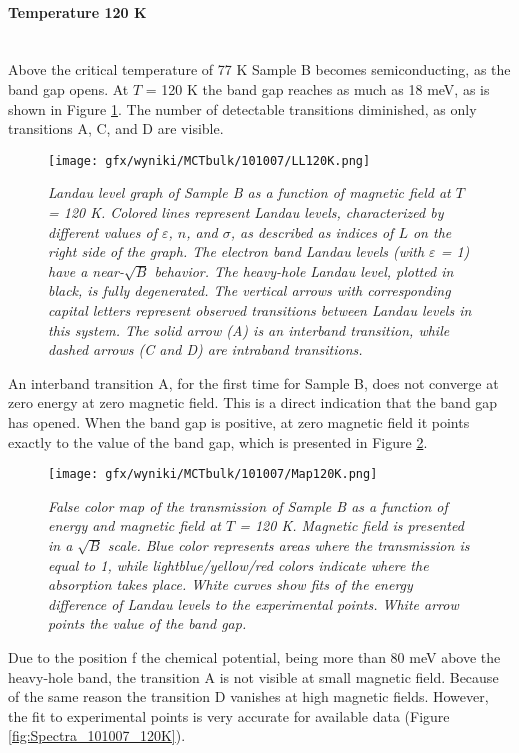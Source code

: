 \documentclass[titlepage,a4paper]{book}
\newcommand{\wciecie}{\quad\phantom{v}}
\newcommand{\myparagraph}[1]{\paragraph{#1}\mbox{}\\}
\begin{document}
\clearpage
\myparagraph{Temperature 120 K}
\wciecie
Above the critical temperature of 77 K Sample B becomes semiconducting, as the band gap opens. At $T$ = 120 K the band gap reaches as much as 18 meV, as is shown in Figure \ref{fig:LL_101007_120K}. The number of detectable transitions diminished, as only transitions A, C, and D are visible.  
\begin{figure}[ht]
	\centering
	\texttt{[image: gfx/wyniki/MCTbulk/101007/LL120K.png]}
	\vspace{-10pt}
	\caption{\textit{Landau level graph of Sample B as a function of magnetic field at $T$ = 120 K. Colored lines represent Landau levels, characterized by different values of $\varepsilon$, $n$, and $\sigma$, as described as indices of $L$ on the right side of the graph. The electron band Landau levels (with $\varepsilon$ = 1) have a near-$\sqrt{B}$ behavior. The heavy-hole Landau level, plotted in black, is fully degenerated. The vertical arrows with corresponding capital letters represent observed transitions between Landau levels in this system. The solid arrow (A) is an interband transition, while dashed arrows (C and D) are intraband transitions.}}
	\label{fig:LL_101007_120K}
\end{figure}

An interband transition A, for the first time for Sample B, does not converge at zero energy at zero magnetic field. This is a direct indication that the band gap has opened. When the band gap is positive, at zero magnetic field it points exactly to the value of the band gap, which is presented in Figure \ref{fig:Map_101007_120K}. 
\begin{figure}[ht]
	\centering
	\texttt{[image: gfx/wyniki/MCTbulk/101007/Map120K.png]}
	\vspace{-10pt}
	\caption{\textit{False color map of the transmission of Sample B as a function of energy and magnetic field at $T$ = 120 K. Magnetic field is presented in a $\sqrt{B}$ scale. Blue color represents areas where the transmission is equal to 1, while lightblue/yellow/red colors indicate where the absorption takes place. White curves show fits of the energy difference of Landau levels to the experimental points. White arrow points the value of the band gap.}}
	\label{fig:Map_101007_120K}
\end{figure} 
Due to the position f the chemical potential, being more than 80 meV above the heavy-hole band, the transition A is not visible at small magnetic field. Because of the same reason the transition D vanishes at high magnetic fields. However, the fit to experimental points is very accurate for available data (Figure \ref{fig:Spectra_101007_120K}). 
\end{document}
